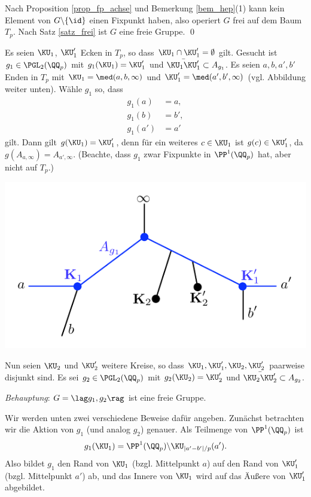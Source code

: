 \bew Nach Proposition \ref{prop_fp_achse} und
Bemerkung \ref{bem_hep}(1)
kann kein Element von $G\backslash\{\id\}$ einen Fixpunkt haben,
also operiert $G$ frei auf dem Baum $T_p$.
Nach Satz \ref{satz_frei} ist $G$ eine freie Gruppe.
\qed

\BSP Es seien $\KU_1$, $\KU_1'$ Ecken in $T_p$, so dass
$\KU_1\cap\KU_1'=\emptyset$ gilt.
Gesucht ist $g_1\in\PGL_2(\QQ_p)$ mit $g_1(\KU_1)=\KU_1'$ und
$\bar{\KU_1 \KU_1'}\subset A_{g_1}$.
Es seien $a,b,a',b'$ Enden in $T_p$ mit
$\KU_1=\med(a,b,\infty)$ und $\KU_1'=\med(a',b',\infty)$
(vgl. Abbildung weiter unten).
Wähle $g_1$ so, dass
\begin{align*}
g_1(a) &= a,\\
g_1(b) &= b',\\
g_1(a') &= a'
\end{align*}
gilt. Dann gilt $g(\KU_1)=\KU_1'$, denn für ein weiteres $c\in\KU_1$
ist $g(c)\in\KU_1'$, da $g(A_{a,\infty})=A_{a',\infty}$.
(Beachte, dass $g_1$ zwar
Fixpunkte in $\PP^1(\QQ_p)$ hat, aber nicht auf $T_p$.)
\begin{center}
	\includegraphics{grugraImages/ihara1}
\end{center}
Nun seien $\KU_2$ und $\KU_2'$ weitere Kreise, so dass
$\KU_1,\KU_1',\KU_2,\KU_2'$ paarweise disjunkt sind.
Es sei $g_2\in\PGL_2(\QQ_p)$ mit $g_2(\KU_2)=\KU_2'$ und
$\bar{\KU_2 \KU_2'}\subset A_{g_2}$.

\textsl{Behauptung}: $G=\lag g_1, g_2 \rag$ ist eine freie Gruppe.

Wir werden unten zwei verschiedene Beweise dafür angeben.
Zunächst betrachten wir die Aktion von $g_1$ (und analog $g_2$)
genauer. Als Teilmenge von $\PP^1(\QQ_p)$ ist
\[
g_1(\KU_1) = \PP^1(\QQ_p) \backslash \KU_{|a'-b'|/p}(a').
\]
Also bildet $g_1$ den Rand von $\KU_1$  (bzgl. Mittelpunkt $a$) auf
den Rand von $\KU_1'$ (bzgl. Mittelpunkt $a'$) ab, und das Innere
von $\KU_1$ wird auf das Äußere von $\KU_1'$ abgebildet.

